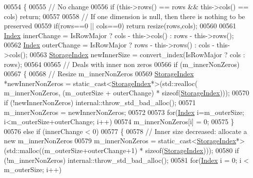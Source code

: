 \begin{DoxyCode}
00554     \{
00555       \textcolor{comment}{// No change}
00556       \textcolor{keywordflow}{if} (this->rows() == rows && this->cols() == cols) \textcolor{keywordflow}{return};
00557       
00558       \textcolor{comment}{// If one dimension is null, then there is nothing to be preserved}
00559       \textcolor{keywordflow}{if}(rows==0 || cols==0) \textcolor{keywordflow}{return} resize(rows,cols);
00560 
00561       \hyperlink{group___core___module_a554f30542cc2316add4b1ea0a492ff02}{Index} innerChange = IsRowMajor ? cols - this->cols() : rows - this->rows();
00562       \hyperlink{group___core___module_a554f30542cc2316add4b1ea0a492ff02}{Index} outerChange = IsRowMajor ? rows - this->rows() : cols - this->cols();
00563       \hyperlink{group___sparse_core___module_a0b540ba724726ebe953f8c0df06081ed}{StorageIndex} newInnerSize = convert\_index(IsRowMajor ? cols : rows);
00564 
00565       \textcolor{comment}{// Deals with inner non zeros}
00566       \textcolor{keywordflow}{if} (m\_innerNonZeros)
00567       \{
00568         \textcolor{comment}{// Resize m\_innerNonZeros}
00569         \hyperlink{group___sparse_core___module_a0b540ba724726ebe953f8c0df06081ed}{StorageIndex} *newInnerNonZeros = \textcolor{keyword}{static\_cast<}\hyperlink{group___sparse_core___module_a0b540ba724726ebe953f8c0df06081ed}{StorageIndex}*\textcolor{keyword}{>}(std::realloc(
      m\_innerNonZeros, (m\_outerSize + outerChange) * \textcolor{keyword}{sizeof}(\hyperlink{group___sparse_core___module_a0b540ba724726ebe953f8c0df06081ed}{StorageIndex})));
00570         \textcolor{keywordflow}{if} (!newInnerNonZeros) internal::throw\_std\_bad\_alloc();
00571         m\_innerNonZeros = newInnerNonZeros;
00572         
00573         \textcolor{keywordflow}{for}(\hyperlink{group___core___module_a554f30542cc2316add4b1ea0a492ff02}{Index} i=m\_outerSize; i<m\_outerSize+outerChange; i++)          
00574           m\_innerNonZeros[i] = 0;
00575       \} 
00576       \textcolor{keywordflow}{else} \textcolor{keywordflow}{if} (innerChange < 0) 
00577       \{
00578         \textcolor{comment}{// Inner size decreased: allocate a new m\_innerNonZeros}
00579         m\_innerNonZeros = \textcolor{keyword}{static\_cast<}\hyperlink{group___sparse_core___module_a0b540ba724726ebe953f8c0df06081ed}{StorageIndex}*\textcolor{keyword}{>}(std::malloc((m\_outerSize+outerChange+1) * \textcolor{keyword}{
      sizeof}(\hyperlink{group___sparse_core___module_a0b540ba724726ebe953f8c0df06081ed}{StorageIndex})));
00580         \textcolor{keywordflow}{if} (!m\_innerNonZeros) internal::throw\_std\_bad\_alloc();
00581         \textcolor{keywordflow}{for}(\hyperlink{group___core___module_a554f30542cc2316add4b1ea0a492ff02}{Index} i = 0; i < m\_outerSize; i++)

\end{DoxyCode}
